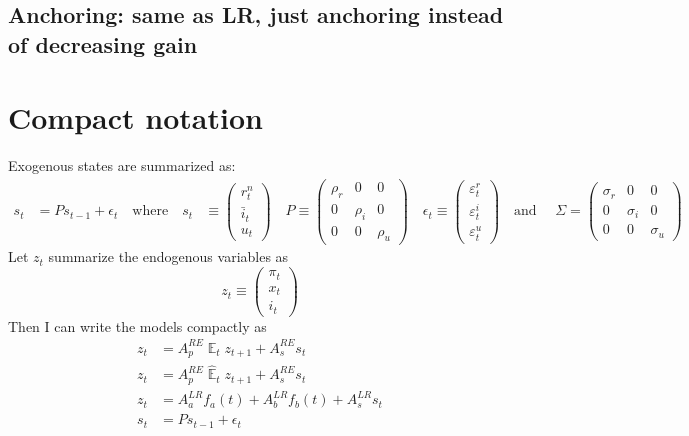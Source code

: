 \documentclass[11pt]{article}
\renewcommand{\[}{\begin{equation}}
\renewcommand{\]}{\end{equation}}
\DeclareMathOperator{\E}{\mathbb{E}}
\begin{document}
\subsection{Anchoring: same as LR, just anchoring instead of decreasing gain}

 \section{Compact notation}
Exogenous states are summarized as:
 \begin{align*}
 s_t & = P s_{t-1} + \epsilon_t 
 \quad \text{where} \quad 
 s_t & \equiv \begin{pmatrix} r_t^n \\ \bar{i}_t \\ u_t 
 \end{pmatrix} \quad 
 P  \equiv \begin{pmatrix} \rho_r & 0 & 0 \\ 0& \rho_i & 0 \\ 0&0& \rho_u 
 \end{pmatrix}  \quad 
 \epsilon_t \equiv \begin{pmatrix}\varepsilon_t^{r} \\ \varepsilon_t^{i}  \\ \varepsilon_t^{u} 
 \end{pmatrix}  \quad  \text{and } \quad \Sigma  =  \begin{pmatrix} \sigma_r & 0 & 0 \\ 0& \sigma_i & 0 \\ 0&0& \sigma_u 
 \end{pmatrix} 
 \end{align*}
 Let $z_t$ summarize the endogenous variables as
 \begin{equation}
 z_t \equiv \begin{pmatrix} \pi_t \\ x_t \\ i_t
 \end{pmatrix}
 \end{equation}
 Then I can write the models compactly as
 \begin{align}
z_t & = A_p^{RE} \E_t z_{t+1} + A_s^{RE} s_t \label{LOM_RE} \\
z_t & = A_p^{RE} \hat{\E}_t z_{t+1} + A_s^{RE} s_t \label{LOM_EE} \\
z_t & = A_a^{LR} f_a(t) + A_b^{LR} f_b(t) + A_s^{LR} s_t \label{LOM_LR} \\
s_t & = P s_{t-1} + \epsilon_t \label{exog}
\end{align}
\end{document}

